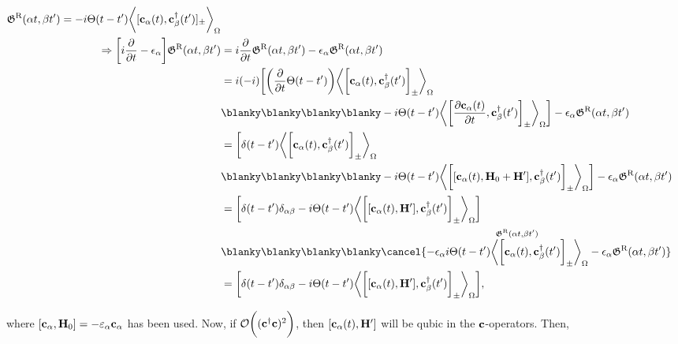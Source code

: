 \begin{equation*} \begin{split}
    \mathfrak{G}^{\textnormal{R}}(\alpha t, \beta t') = -i \Theta(t-t') \bigg\langle [{\bf c}_{\alpha}(t),{\bf c}_{\beta}^\dagger(t') ]_{\pm}\bigg\rangle_{\Omega} \\
    \Rightarrow \bigg[i \frac{\partial}{ \partial t} - \epsilon_{\alpha}\bigg] \mathfrak{G}^{\textnormal{R}}(\alpha t, \beta t') &= i \frac{\partial}{ \partial t}\mathfrak{G}^{\textnormal{R}}(\alpha t, \beta t') - \epsilon_{\alpha}\mathfrak{G}^{\textnormal{R}}(\alpha t, \beta t') \\
    &= i (-i) \bigg[\bigg(\frac{\partial}{ \partial t} \Theta(t-t')\bigg) \bigg\langle\bigg[{\bf c}_{\alpha}(t),{\bf c}_{\beta}^\dagger(t') \bigg]_{\pm}\bigg\rangle_{\Omega} \\
    & \blanky \blanky \blanky \blanky- i\Theta(t-t') \bigg\langle\bigg[\frac{\partial{\bf c}_{\alpha}(t)}{\partial t},{\bf c}_{\beta}^\dagger(t') \bigg]_{\pm}\bigg\rangle_{\Omega} \bigg]- \epsilon_{\alpha}\mathfrak{G}^{\textnormal{R}}(\alpha t, \beta t') \\
    &= \bigg[\delta(t-t') \bigg\langle\bigg[{\bf c}_{\alpha}(t),{\bf c}_{\beta}^\dagger(t') \bigg]_{\pm}\bigg\rangle_{\Omega} \\
    & \blanky \blanky \blanky \blanky- i\Theta(t-t') \bigg\langle\bigg[[{\bf c}_{\alpha}(t), {\bf H}_0 + {\bf H'}],{\bf c}_{\beta}^\dagger(t') \bigg]_{\pm}\bigg\rangle_{\Omega} \bigg]- \epsilon_{\alpha}\mathfrak{G}^{\textnormal{R}}(\alpha t, \beta t') \\
    &= \bigg[\delta(t-t') \delta_{\alpha \beta} - i \Theta(t-t') \bigg\langle\bigg[[{\bf c}_{\alpha}(t), {\bf H'}], {\bf c}_{\beta}^\dagger(t') \bigg]_{\pm}\bigg\rangle_{\Omega} \bigg]  \\
    & \blanky \blanky \blanky \blanky \cancel{- \epsilon_{\alpha} \overset{\mathfrak{G}^{\textnormal{R}}(\alpha t, \beta t')}{i  \Theta(t-t')\bigg\langle\bigg[{{\bf c}_{\alpha}(t)},{\bf c}_{\beta}^\dagger(t') \bigg]_{\pm}\bigg\rangle_{\Omega}} - \epsilon_{\alpha} \mathfrak{G}^{\textnormal{R}}(\alpha t, \beta t')} \\
    &= \bigg[\delta(t-t') \delta_{\alpha \beta} - i \Theta(t-t') \bigg\langle\bigg[[{\bf c}_{\alpha}(t), {\bf H'}], {\bf c}_{\beta}^\dagger(t') \bigg]_{\pm}\bigg\rangle_{\Omega} \bigg],
\end{split}
\end{equation*}

where $[{\bf c}_{\alpha}, {\bf H}_0] = -\varepsilon_{\alpha} {\bf c}_{\alpha}$ has been used. 
Now, if $\mathcal{O}\bigg(({{\bf c}}^\dagger {{\bf c}})^2\bigg)$, then $[{\bf c}_{\alpha}(t), {\bf H}']$ will be qubic in the ${\bf c}$-operators. Then, 

